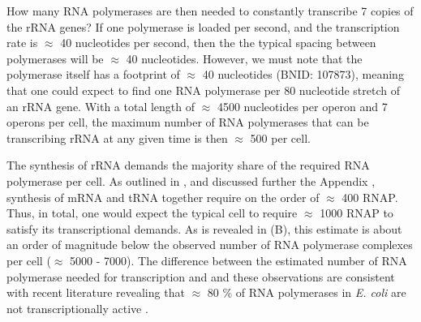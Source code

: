 
How many RNA polymerases are then needed to constantly transcribe 7 copies of
the rRNA genes? If one polymerase is loaded per second, and the transcription
rate is $\approx$ 40 nucleotides per second, then the the typical spacing
between polymerases will be $\approx$ 40 nucleotides. However, we must note that
the polymerase itself has a footprint of $\approx$ 40 nucleotides (BNID: 107873), meaning that
one could expect to find one RNA polymerase per 80 nucleotide stretch of an rRNA
gene.  With a total length of
$\approx$ 4500 nucleotides per operon and 7 operons per cell, the maximum
number of RNA polymerases that can be transcribing rRNA at any given time is then
$\approx$ 500 per cell.

The synthesis of rRNA demands the majority share of the required RNA polymerase
per cell. As outlined in , and discussed further the Appendix
, synthesis of mRNA and tRNA together require on
the order of $\approx$ 400 RNAP. Thus, in total, one would expect the typical
cell to require $\approx$ 1000 RNAP to satisfy its transcriptional demands.
As is revealed in (B), this estimate is about an order of magnitude below the
observed number of RNA polymerase complexes per cell ($\approx$ 5000 - 7000).
The difference between the estimated number of RNA polymerase needed for
transcription and and these observations are consistent with recent literature
revealing that $\approx$ 80 \% of RNA polymerases in \textit{E. coli} are not
transcriptionally active \citep{patrick2015}. 

